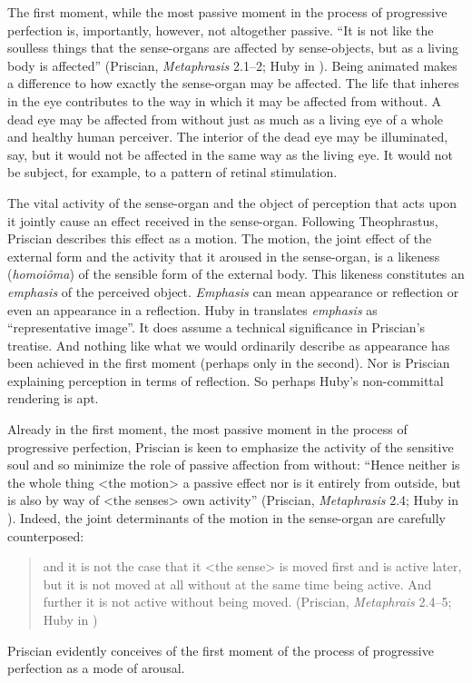 \documentclass[12pt]{article}
\begin{document}
The first moment, while the most passive moment in the process of progressive perfection is, importantly, however, not altogether passive. ``It is not like the soulless things that the sense-organs are affected by sense-objects, but as a living body is affected'' (Priscian, \emph{Metaphrasis} 2.1--2; Huby in \citealt[9--10]{Sorabji:1997ly}). Being animated makes a difference to how exactly the sense-organ may be affected. The life that inheres in the eye contributes to the way in which it may be affected from without. A dead eye may be affected from without just as much as a living eye of a whole and healthy human perceiver. The interior of the dead eye may be illuminated, say, but it would not be affected in the same way as the living eye. It would not be subject, for example, to a pattern of retinal stimulation. 

The vital activity of the sense-organ and the object of perception that acts upon it jointly cause an effect received in the sense-organ. Following Theophrastus, Priscian describes this effect as a motion. The motion, the joint effect of the external form and the activity that it aroused in the sense-organ, is a likeness (\emph{homoiôma}) of the sensible form of the external body. This likeness constitutes an \emph{emphasis} of the perceived object. \emph{Emphasis} can mean appearance or reflection or even an appearance in a reflection. Huby in \citet[51 n.25]{Sorabji:1997ly} translates \emph{emphasis} as ``representative image''. It does assume a technical significance in Priscian's treatise. And nothing like what we would ordinarily describe as appearance has been achieved in the first moment (perhaps only in the second). Nor is Priscian explaining perception in terms of reflection. So perhaps Huby's non-committal rendering is apt.

Already in the first moment, the most passive moment in the process of progressive perfection, Priscian is keen to emphasize the activity of the sensitive soul and so minimize the role of passive affection from without: ``Hence neither is the whole thing <the motion> a passive effect nor is it entirely from outside, but is also by way of <the senses> own activity'' (Priscian, \emph{Metaphrasis} 2.4; Huby in \citealt[10]{Sorabji:1997ly}). Indeed, the joint determinants of the motion in the sense-organ are carefully counterposed: 
\begin{quote}
	and it is not the case that it <the sense> is moved first and is active later, but it is not moved at all without at the same time being active. And further it is not active without being moved. (Priscian, \emph{Metaphrais} 2.4--5; Huby in \citealt[10]{Sorabji:1997ly})
\end{quote}
Priscian evidently conceives of the first moment of the process of progressive perfection as a mode of arousal.
\end{document}
